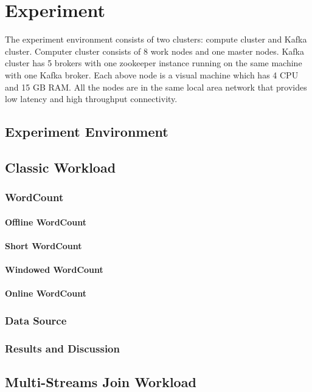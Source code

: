 \chapter{Experiment}
\label{chapter:experiment}
The experiment environment consists of two clusters: compute cluster and Kafka cluster. Computer cluster consists of 8 work nodes and one master nodes. Kafka cluster has 5 brokers with one zookeeper instance running on the same machine with one Kafka broker. Each above node is a visual machine which has 4 CPU and 15 GB RAM. All the nodes are in the same local area network that provides low latency and high throughput connectivity. 

\section{Experiment Environment}
\label{sec:triton}

\section{Classic Workload}
\subsection{WordCount}
\subsubsection{Offline WordCount}
\subsubsection{Short WordCount}
\subsubsection{Windowed WordCount}
\subsubsection{Online WordCount}

\subsection{Data Source}
\subsection{Results and Discussion}

\section{Multi-Streams Join Workload}
